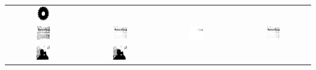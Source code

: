 \documentclass[main]{subfiles}
\begin{document}
\begin{table}
\begin{tabular}{c||c|c|c}
\includegraphics[width=0.2\textwidth]{img/res/e1a/alg1tipo6d1.25-02.jpg} \\
\includegraphics[width=0.2\textwidth]{img/res/e1a/alg1tipo1-09.jpg} &
\includegraphics[width=0.2\textwidth]{img/res/e1a/alg1tipo6-09.jpg} &
\includegraphics[width=0.2\textwidth]{img/res/e1a/alg1tipo6d0.75-09.jpg} &
\includegraphics[width=0.2\textwidth]{img/res/e1a/alg1tipo6d1.25-09.jpg} \\
\includegraphics[width=0.2\textwidth]{img/res/e1a/alg1tipo1-07.jpg} &
\includegraphics[width=0.2\textwidth]{img/res/e1a/alg1tipo6-07.jpg} &

\end{tabular}
\end{table}
\end{document}
